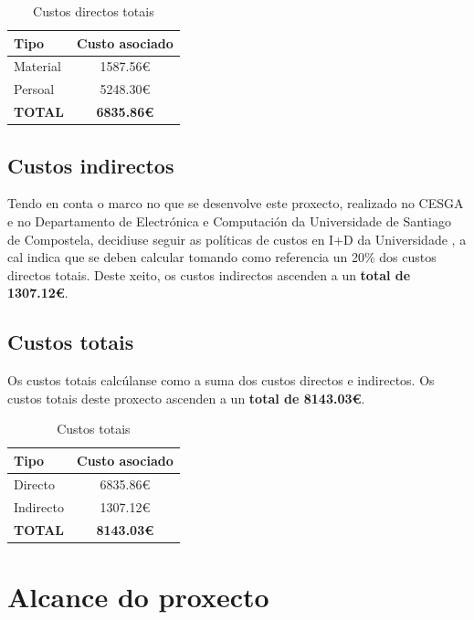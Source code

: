 \begin{table}[H]
\centering
\caption{Custos directos totais}
\label{custosDirectosTotais}
\begin{tabular}{|l|c|}
\hline
\textbf{Tipo} & \textbf{Custo asociado} \\ \hline
Material & 1587.56\euro \\ \hline
Persoal & 5248.30\euro \\ \hline \hline
\textbf{TOTAL} & \textbf{6835.86\euro} \\ \hline
\end{tabular}
\end{table}

\subsection{Custos indirectos}

Tendo en conta o marco no que se desenvolve este proxecto, realizado no \gls{CESGA} e no Departamento de Electrónica e Computación da Universidade de Santiago de Compostela, decidiuse seguir as políticas de custos en I+D da Universidade \cite{xestionEconomicaUSC}, a cal indica que se deben calcular tomando como referencia un 20\% dos custos directos totais. Deste xeito, os custos indirectos ascenden a un \textbf{total de 1307.12\euro}.

\subsection{Custos totais}

Os custos totais calcúlanse como a suma dos custos directos e indirectos. Os custos totais deste proxecto ascenden a un \textbf{total de 8143.03\euro}.

\begin{table}[H]
\centering
\caption{Custos totais}
\label{custosTotais}
\begin{tabular}{|l|c|}
\hline
\textbf{Tipo} & \textbf{Custo asociado} \\ \hline
Directo & 6835.86\euro \\ \hline
Indirecto & 1307.12\euro \\ \hline \hline
\textbf{TOTAL} & \textbf{8143.03\euro} \\ \hline
\end{tabular}
\end{table}

\section{Alcance do proxecto}

